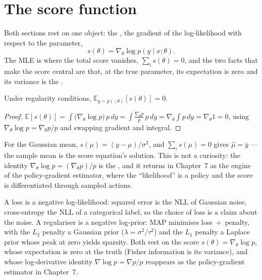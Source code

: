 \documentclass[11pt]{article}
\begin{document}
\section{The score function}

Both sections rest on one object: the , the gradient of the
log-likelihood with respect to the parameter,
\[
  s(\theta) = \nabla_\theta \log p(y\mid x;\theta).
\]
The MLE is where the total score vanishes, $\sum_i s(\theta)=0$, and the two
facts that make the score central are that, at the true parameter, its
expectation is zero and its variance is the .

\begin{theorem}
Under regularity conditions, $\mathbb{E}_{y\sim p(\cdot;\theta)}[s(\theta)] = 0$.
\end{theorem}
\begin{proof}
$\mathbb{E}[s(\theta)] = \int \big(\nabla_\theta \log p\big)\,p\,dy
 = \int \frac{\nabla_\theta p}{p}\,p\,dy = \nabla_\theta\!\int p\,dy
 = \nabla_\theta 1 = 0$, using $\nabla_\theta\log p = \nabla_\theta p / p$ and
swapping gradient and integral.
\end{proof}

For the Gaussian mean, $s(\mu)=(y-\mu)/\sigma^2$, and $\sum_i s(\mu)=0$ gives
$\hat\mu = \bar y$ --- the sample mean is the score equation's solution. This is
not a curiosity: the identity $\nabla_\theta\log p = (\nabla_\theta p)/p$ is the
, and it returns in Chapter~7 as the engine of the
policy-gradient estimator, where the ``likelihood'' is a policy and the score is
differentiated through sampled actions.

\begin{summarybox}
A loss is a negative log-likelihood: squared error is the NLL of Gaussian noise,
cross-entropy the NLL of a categorical label, so the choice of loss is a claim
about the noise. A regulariser is a negative log-prior: MAP minimises
loss~$+$~penalty, with the $L_2$ penalty a Gaussian prior
($\lambda=\sigma^2/\tau^2$) and the $L_1$ penalty a Laplace prior whose peak at
zero yields sparsity. Both rest on the score $s(\theta)=\nabla_\theta\log p$,
whose expectation is zero at the truth (Fisher information is its variance), and
whose log-derivative identity $\nabla\log p=\nabla p/p$ reappears as the
policy-gradient estimator in Chapter~7.
\end{summarybox}
\end{document}
